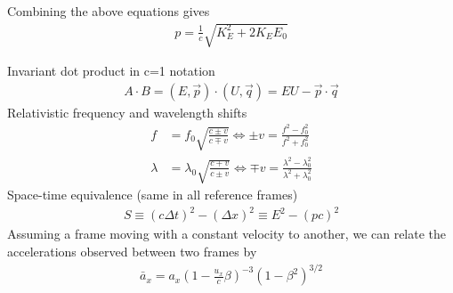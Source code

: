 \begin{multicols}{2}
Combining the above equations gives
\begin{align}
p=\frac{1}{c}\sqrt{K_E^2 + 2K_EE_0}
\end{align}

Invariant dot product in c=1 notation
\begin{align}
A \cdot B = (E, \vec{p}) \cdot (U, \vec{q}) = EU - \vec{p} \cdot \vec{q}
\end{align}
Relativistic frequency and wavelength shifts
\begin{align}
f &= f_0 \sqrt{\frac{c \pm v}{c \mp v}} 
\Longleftrightarrow \pm v=\frac{f^2-f_0^2}{f^2+f_0^2}  \\
\lambda &= \lambda_0 \sqrt{\frac{c \mp v}{c \pm v}} 
\Longleftrightarrow \mp v =\frac{\lambda^2-\lambda_0^2}{\lambda^2+\lambda_0^2}
\end{align}
Space-time equivalence (same in all reference frames)
\begin{align}
S \equiv (c \Delta t)^2 - (\Delta x)^2 \equiv E^2-(pc)^2
\end{align}
Assuming a frame moving with a constant velocity to another, we can relate the accelerations observed between two frames by
\begin{align}
	\bar{a}_x = a_x\left(1-\frac{u_x }{c}\beta\right)^{-3}\left(1-\beta^2\right)^{3/2}
\end{align}

\end{multicols}
